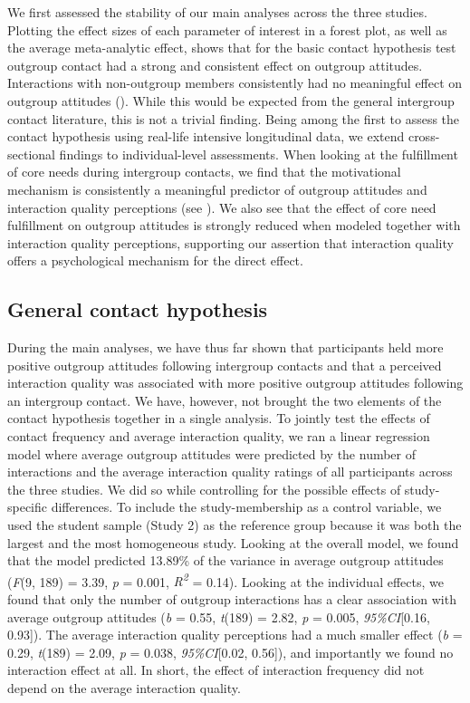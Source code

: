 We first assessed the stability of our main analyses across the three
studies. Plotting the effect sizes of each parameter of interest in a
forest plot, as well as the average meta-analytic effect, shows that for
the basic contact hypothesis test outgroup contact had a strong and
consistent effect on outgroup attitudes. Interactions with non-outgroup
members consistently had no meaningful effect on outgroup attitudes
(). While this would be expected from the
general intergroup contact literature, this is not a trivial finding.
Being among the first to assess the contact hypothesis using real-life
intensive longitudinal data, we extend cross-sectional findings to
individual-level assessments. When looking at the fulfillment of core
needs during intergroup contacts, we find that the motivational
mechanism is consistently a meaningful predictor of outgroup attitudes
and interaction quality perceptions (see
). We also see that the
effect of core need fulfillment on outgroup attitudes is strongly
reduced when modeled together with interaction quality perceptions,
supporting our assertion that interaction quality offers a psychological
mechanism for the direct effect.

\subsection{General contact hypothesis}

During the main analyses, we have thus far shown that participants held
more positive outgroup attitudes following intergroup contacts and that
a perceived interaction quality was associated with more positive
outgroup attitudes following an intergroup contact. We have, however,
not brought the two elements of the contact hypothesis together in a
single analysis. To jointly test the effects of contact frequency and
average interaction quality, we ran a linear regression model where
average outgroup attitudes were predicted by the number of interactions
and the average interaction quality ratings of all participants across
the three studies. We did so while controlling for the possible effects
of study-specific differences. To include the study-membership as a
control variable, we used the student sample (Study 2) as the reference
group because it was both the largest and the most homogeneous study.
Looking at the overall model, we found that the model predicted 13.89\%
of the variance in average outgroup attitudes (\textit{F}(9, 189) =
3.39, \textit{p} = 0.001, \textit{R\textsuperscript{2}} = 0.14). Looking
at the individual effects, we found that only the number of outgroup
interactions has a clear association with average outgroup attitudes
(\textit{b} = 0.55, \textit{t}(189) = 2.82, \textit{p} = 0.005,
\textit{95\%CI}{[}0.16, 0.93{]}). The average interaction quality
perceptions had a much smaller effect (\textit{b} = 0.29,
\textit{t}(189) = 2.09, \textit{p} = 0.038, \textit{95\%CI}{[}0.02,
0.56{]}), and importantly we found no interaction effect at all. In
short, the effect of interaction frequency did not depend on the average
interaction quality.

